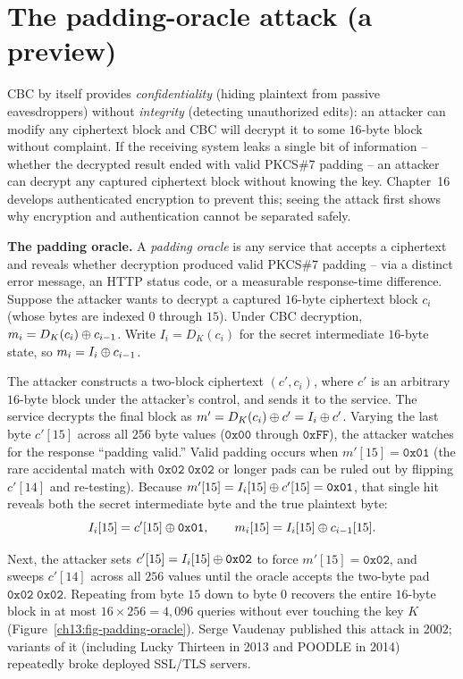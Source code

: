 \section{The padding-oracle attack (a preview)}

CBC by itself provides \emph{confidentiality} (hiding plaintext from passive eavesdroppers) without \emph{integrity} (detecting unauthorized edits): an attacker can modify any ciphertext block and CBC will decrypt it to some $16$-byte block without complaint. If the receiving system leaks a single bit of information -- whether the decrypted result ended with valid PKCS\#7 padding -- an attacker can decrypt any captured ciphertext block without knowing the key. Chapter~16 develops authenticated encryption to prevent this; seeing the attack first shows why encryption and authentication cannot be separated safely.

\begin{attackbox}
\textbf{The padding oracle.} A \emph{padding oracle} is any service that accepts a ciphertext and reveals whether decryption produced valid PKCS\#7 padding -- via a distinct error message, an HTTP status code, or a measurable response-time difference. Suppose the attacker wants to decrypt a captured $16$-byte ciphertext block $c_i$ (whose bytes are indexed $0$ through $15$). Under CBC decryption, $m_i = D_K(c_i) \oplus c_{i-1}$. Write $I_i = D_K(c_i)$ for the secret intermediate $16$-byte state, so $m_i = I_i \oplus c_{i-1}$.

The attacker constructs a two-block ciphertext $(c', c_i)$, where $c'$ is an arbitrary $16$-byte block under the attacker's control, and sends it to the service. The service decrypts the final block as $m' = D_K(c_i) \oplus c' = I_i \oplus c'$. Varying the last byte $c'[15]$ across all $256$ byte values ($\mathtt{0x00}$ through $\mathtt{0xFF}$), the attacker watches for the response ``padding valid.'' Valid padding occurs when $m'[15] = \mathtt{0x01}$ (the rare accidental match with $\mathtt{0x02\;0x02}$ or longer pads can be ruled out by flipping $c'[14]$ and re-testing). Because $m'[15] = I_i[15] \oplus c'[15] = \mathtt{0x01}$, that single hit reveals both the secret intermediate byte and the true plaintext byte:
\[
I_i[15] = c'[15] \oplus \mathtt{0x01}, \qquad m_i[15] = I_i[15] \oplus c_{i-1}[15].
\]

Next, the attacker sets $c'[15] = I_i[15] \oplus \mathtt{0x02}$ to force $m'[15] = \mathtt{0x02}$, and sweeps $c'[14]$ across all $256$ values until the oracle accepts the two-byte pad $\mathtt{0x02\;0x02}$. Repeating from byte $15$ down to byte $0$ recovers the entire $16$-byte block in at most $16 \times 256 = 4{,}096$ queries without ever touching the key $K$ (Figure~\ref{ch13:fig-padding-oracle}). Serge Vaudenay published this attack in 2002; variants of it (including Lucky Thirteen in 2013 and POODLE in 2014) repeatedly broke deployed SSL/TLS servers.
\end{attackbox}

